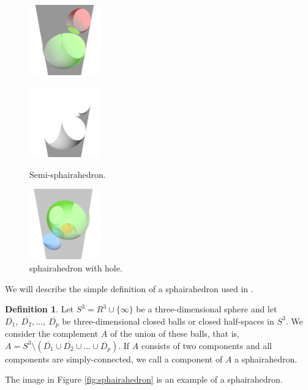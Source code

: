\documentclass[suppldata, dvipdfmx]{interact}
\theoremstyle{plain}%
\theoremstyle{definition}
\newtheorem{definition}[theorem]{Definition}
\theoremstyle{remark}
\theoremstyle{problemstyle}
\begin{document}
\begin{figure}[h!tbp]
 \begin{minipage}[t]{0.6\textwidth}
  \begin{minipage}[t]{0.3\textwidth}
   \centering
   \includegraphics[width=1.2in, height=1.2in,
   keepaspectratio]{./img/sphairahedralPrism/semiSphairaAll.png}
   \label{fig:semi-sphairaAll}
  \end{minipage}
  \hspace*{\fill}
  \begin{minipage}[t]{0.3\textwidth}
   \centering
   \includegraphics[width=1.2in, height=1.2in,
   keepaspectratio]{./img/sphairahedralPrism/semiSphairaHalf.png}
   \label{fig:semi-sphairaHalf}
  \end{minipage}
  \hspace*{\fill}
  \caption{Semi-sphairahedron.}
  \label{fig:semi-sphairahedron}
 \end{minipage}
 \begin{minipage}[t]{0.3\textwidth}
  \centering
 \includegraphics[width=1.2in, height=1.2in,
 keepaspectratio]{./img/sphairahedralPrism/hole.png}
 \caption{sphairahedron with hole.}
  \label{fig:brokenHole}
 \end{minipage}
\end{figure}

We will describe the simple definition of a sphairahedron used in \cite{bridges2018}.
\begin{definition}
Let $S^3 = R^3 \cup \{\infty\}$ be a three-dimensional sphere and let
$\overline{D_1},~\overline{D_2},\ldots,~\overline{D_p}$ be
three-dimensional closed balls or closed half-spaces in $S^3$.
We consider the complement $A$ of the union of these balls, that is,
$A = S^3 \setminus (\overline{D_1} \cup \overline{D_2} \cup ... \cup \overline{D_p})$.
If $A$ consists of two components and all components are simply-connected,
we call a component of $A$ a sphairahedron.
\end{definition}
The image in Figure \ref{fig:sphairahedron}
is an example of a sphairahedron. 
\end{document}
